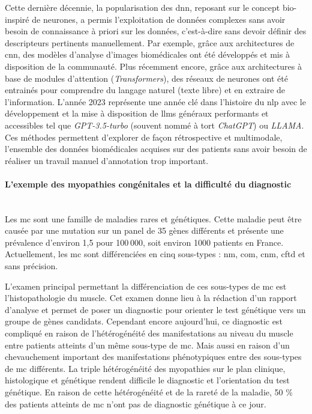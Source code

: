 Cette dernière décennie, la popularisation des \gls{dnn}, reposant sur le concept bio-inspiré de neurones, a permis l’exploitation de données complexes sans avoir besoin de connaissance à priori sur les données, c’est-à-dire sans devoir définir des descripteurs pertinents manuellement. Par exemple, grâce aux architectures de \gls{cnn}, des modèles d’analyse d’images biomédicales ont été développés et mis à disposition de la communauté. Plus récemment encore, grâce aux architectures à base de modules d’attention (\textit{Transformers}), des réseaux de neurones ont été entrainés pour comprendre du langage naturel (texte libre) et en extraire de l’information. L’année 2023 représente une année clé dans l’histoire du \gls{nlp} avec le développement et la mise à disposition de \gls{llms} généraux performants et accessibles tel que \textit{GPT-3.5-turbo} (souvent nommé à tort \textit{ChatGPT}) ou \textit{LLAMA}. Ces méthodes permettent d’explorer de façon rétrospective et multimodale, l’ensemble des données biomédicales acquises sur des patients sans avoir besoin de réaliser un travail manuel d’annotation trop important.

\paragraph{\textbf{L’exemple des myopathies congénitales et la difficulté du diagnostic}}\mbox{}\\

Les \gls{mc} sont une famille de maladies rares et génétiques. Cette maladie peut être causée par une mutation sur un panel de 35 gènes différents et présente une prévalence d’environ 1,5 pour 100 000, soit environ 1000 patients en France. Actuellement, les \gls{mc} sont différenciées en cinq sous-types : \gls{nm}, \gls{com}, \gls{cnm}, \gls{cftd} et sans précision.

L’examen principal permettant la différenciation de ces sous-types de \gls{mc} est l’histopathologie du muscle. Cet examen donne lieu à la rédaction d’un rapport d’analyse et permet de poser un diagnostic pour orienter le test génétique vers un groupe de gènes candidats. Cependant encore aujourd’hui, ce diagnostic est compliqué en raison de l’hétérogénéité des manifestations au niveau du muscle entre patients atteints d’un même sous-type de \gls{mc}. Mais aussi en raison d’un chevauchement important des manifestations phénotypiques entre des sous-types de \gls{mc} différents. La triple hétérogénéité des myopathies sur le plan clinique, histologique et génétique rendent difficile le diagnostic et l’orientation du test génétique. En raison de cette hétérogénéité et de la rareté de la maladie, 50 \% des patients atteints de \gls{mc} n’ont pas de diagnostic génétique à ce jour. 

